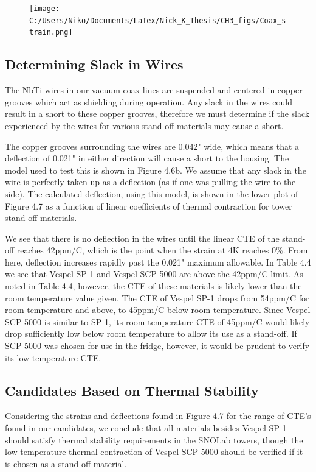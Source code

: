 \documentclass{report}
\begin{document}
\begin{figure}[ht]
\centering
\texttt{[image: C:/Users/Niko/Documents/LaTex/Nick\_K\_Thesis/CH3\_figs/Coax\_strain.png]}
\caption{}
\end{figure}

\subsection{Determining Slack in Wires}

The NbTi wires in our vacuum coax lines are suspended and centered in copper grooves which act as shielding during operation. Any slack in the wires could result in a short to these copper grooves, therefore we must determine if the slack experienced by the wires for various stand-off materials may cause a short.

The copper grooves surrounding the wires are 0.042" wide, which means that a deflection of 0.021" in either direction will cause a short to the housing. The model used to test this is shown in Figure 4.6b. We assume that any slack in the wire is perfectly taken up as a deflection (as if one was pulling the wire to the side). The calculated deflection, using this model, is shown in the lower plot of Figure 4.7 as a function of linear coefficients of thermal contraction for tower stand-off materials.

We see that there is no deflection in the wires until the linear CTE of the stand-off reaches 42ppm/C, which is the point when the strain at 4K reaches 0\%. From here, deflection increases rapidly past the 0.021" maximum allowable. In Table 4.4 we see that Vespel SP-1 and Vespel SCP-5000 are above the 42ppm/C limit. As noted in Table 4.4, however, the CTE of these materials is likely lower than the room temperature value given. The CTE of Vespel SP-1 drops from 54ppm/C for room temperature and above, to 45ppm/C below room temperature. Since Vespel SCP-5000 is similar to SP-1, its room temperature CTE of 45ppm/C would likely drop sufficiently low below room temperature to allow its use as a stand-off. If SCP-5000 was chosen for use in the fridge, however, it would be prudent to verify its low temperature CTE.

\subsection{Candidates Based on Thermal Stability}
Considering the strains and deflections found in Figure 4.7 for the range of CTE's found in our candidates, we conclude that all materials besides Vespel SP-1 should satisfy thermal stability requirements in the SNOLab towers, though the low temperature thermal contraction of Vespel SCP-5000 should be verified if it is chosen as a stand-off material.
\end{document}
